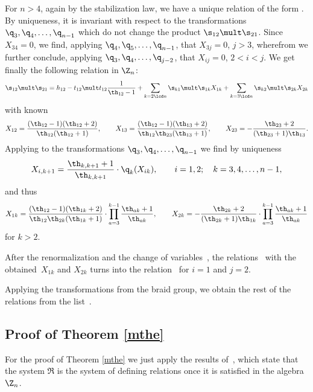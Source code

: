 For $n>4$, again by the stabilization law, we have a unique relation of the form . By uniqueness, it is invariant with respect to the
transformations $\q_3,\q_4,\dots ,\q_{n-1}$ which do not change the product $\s_{12}\mult \s_{21}$. Since $X_{34}=0$, we f\/ind, applying
$\q_4, \q_5, \dots ,\q_{n-1}$,  that  $X_{3j}=0$, $j>3$, wherefrom we further conclude, applying $\q_3,\q_4,\dots ,\q_{j-2}$, that
$X_{ij}=0$, $2<i<j$. We get f\/inally the following relation in $\Z_n$:
\begin{gather} \label{soo1221}
\s_{12}\mult \s_{21}=h_{12}-t_{12}\mult t_{12} \frac{1}{\th_{12}-1}
+\sum_{k=2\lcd n}\s_{k1}\mult\s_{1k}X_{1k}+\sum_{k=3\lcd n}\s_{k2}\mult\s_{2k}X_{2k}
\end{gather}
with known
\begin{gather*}
X_{12}=\frac{(\th_{12}-1)(\th_{12} +2)}{\th_{12}(\th_{12} +1)} ,\qquad
X_{13}=\frac{(\th_{12}-1) (\th_{13} +2)}{\th_{12}\th_{23}(\th_{13}+1)} ,\qquad
X_{23}=-\frac{\th_{23} +2}{(\th_{23} +1)\th_{13}} .
\end{gather*}
Applying to  the transformations $\q_3, \q_4,\dots ,\q_{n-1}$ we f\/ind by uniqueness
\begin{gather*}X_{i,k+1}=\frac{\th_{k,k+1}+1}{\th_{k,k+1}} \cdot\q_k(X_{ik}) ,\qquad i=1,2 ;\quad k=3,4,\dots ,n-1 ,
\end{gather*}
and thus
\begin{gather*}
 X_{1k}=\frac{(\th_{12}-1) (\th_{1k} +2)}{\th_{12}\th_{2k}(\th_{1k}+1)}\cdot\prod_{a=3}^{k-1}\frac{\th_{ak}+1}{\th_{ak}}  ,
\qquad X_{2k}=-\frac{\th_{2k} +2}{(\th_{2k} +1)\th_{1k}}\cdot\prod_{a=3}^{k-1}\frac{\th_{ak}+1}{\th_{ak}}
\end{gather*}
for $k>2$.


After the renormalization  and the change of variables~, the relations~  with the
obtained~$X_{1k}$ and $X_{2k}$ turns into the relation~ for $i=1$ and $j=2$.


Applying the transformations from the braid group, we obtain the rest of the relations from the list~.

\subsection{Proof of Theorem \ref{mthe}}\label{proofmain}

For the proof of Theorem \ref{mthe} we just apply the results of~\cite{KO3}, which state that the system ${\mathfrak R}$ is the system of
def\/ining relations once it is satisf\/ied in the algebra $\Z_n$.

